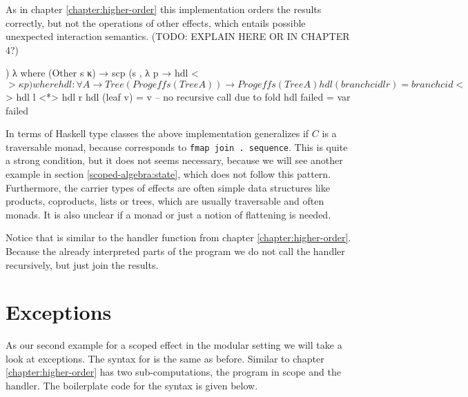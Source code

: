\begin{AgdaAlign}
As in chapter \ref{chapter:higher-order} this implementation orders the results 
correctly, but not the operations of other effects, which entails possible
unexpected interaction semantics.
(TODO: EXPLAIN HERE OR IN CHAPTER 4?)

\begin{code}
  ) λ where
    (Other s κ)  → scp (s , λ p → hdl <$> κ p)
  where
    hdl : ∀ {A} → Tree (Prog effs (Tree A)) → Prog effs (Tree A)
    hdl (branch cid l r)  = branch cid <$> hdl l <*> hdl r
    hdl (leaf v)          = v -- no recursive call due to fold
    hdl failed            = var failed
\end{code}
\end{AgdaAlign}
In terms of Haskell type classes the above implementation generalizes if $C$ is
a traversable monad, because  corresponds to
\texttt{fmap join . sequence}.
This is quite a strong condition, but it does not seems necessary, because we
will see another example in section \ref{scoped-algebra:state}, which does not
follow this pattern.
Furthermore, the carrier types of effects are often simple data structures like
products, coproducts, lists or trees, which are usually traversable and often
monads.
It is also unclear if a monad or just a notion of flattening is needed.


Notice that  is similar to the handler function from
chapter \ref{chapter:higher-order}.
Because the  already interpreted parts of the program we do
not call the handler recursively, but just join the results.


\section{Exceptions}

As our second example for a scoped effect in the modular setting we will take a
look at exceptions.
The syntax for  is the same as before.
Similar to chapter \ref{chapter:higher-order}  has two
sub-computations, the program in scope and the handler.
The boilerplate code for the syntax is given below.

